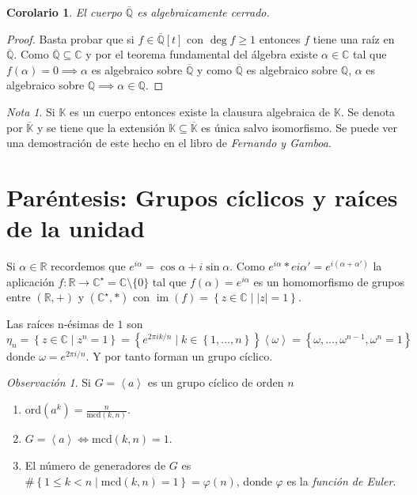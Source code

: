 \documentclass[10pt, spanish]{report}
\newtheorem{cor}{Corolario}[tma]
\theoremstyle{definition}
\theoremstyle{custom}
\theoremstyle{remark}
\newtheorem*{obs}{Observación}
\newtheorem*{nota}{Nota}
\newcommand{\Q}{\mathbb{Q}}
\newcommand{\R}{\mathbb{R}}
\newcommand{\C}{\mathbb{C}}
\newcommand{\K}{\mathbb{K}}
\newcommand{\im}[1]{\operatorname{im}\left(#1\right)}
\newcommand{\ord}[1]{\text{ord}(#1)}
\newcommand{\mcd}[1]{\text{mcd}(#1)}
\renewcommand{\geq}{\geqslant}
\renewcommand{\leq}{\leqslant}
\begin{document}
\begin{cor}
    El cuerpo $\overline{\Q}$ es algebraicamente cerrado.
\end{cor}

\begin{proof}
    Basta probar que si $f\in\overline{\Q}[t]$ con $\deg{f}\geq1$ entonces $f$
    tiene una raíz en $\overline{\Q}$. Como $\overline{\Q}\subseteq\C$ y por el
    teorema fundamental del álgebra existe $\alpha\in\C$ tal que $f(\alpha)=0
    \implies\alpha$ es algebraico sobre $\overline{\Q}$ y como $\overline{\Q}$
    es algebraico sobre $\Q$, $\alpha$ es algebraico sobre $\Q \implies
    \alpha\in\Q$.
\end{proof}

\begin{nota}
    Si $\K$ es un cuerpo entonces existe la clausura algebraica de $\K$. Se
    denota por $\overline{\K}$ y se tiene que la extensión $\K\subseteq
    \overline{\K}$ es única salvo isomorfismo. Se puede ver una demostración de
    este hecho en el libro de \textit{Fernando y Gamboa}.
\end{nota}

\section{Paréntesis: Grupos cíclicos y raíces de la unidad}

Si $\alpha\in\R$ recordemos que $e^{i\alpha}=\cos{\alpha}+i\sin{\alpha}$. Como
$e^{i\alpha}*e{i\alpha'}=e^{i(\alpha+\alpha')}$ la aplicación
$f:\R\to\C^\star=\C\setminus\{0\}$ tal que $f(\alpha)=e^{i\alpha}$ es un
homomorfismo de grupos entre $(\R,+)$ y $(\C^\star,*)$ con $\im{f}=\left\{ z\in
\C\mid \left| z \right| = 1 \right\}$.

Las raíces n-ésimas de $1$ son \[\eta_n=\left\{ z\in \C\mid z^n=1 \right\} =
\left\{ e^{2\pi ik/n}\mid k\in\left\{1,\ldots,n\right\}\right\}\left< \omega
\right> = \left\{ \omega,\ldots,\omega^{n-1},\omega^n=1 \right\}\]
donde $\omega = e^{2\pi i /n}$. Y por tanto forman un grupo cíclico.

\begin{obs}
    Si $G= \left< a \right>$ es un grupo cíclico de orden $n$
    \begin{enumerate}
        \item $\ord{a^k}=\frac{n}{\mcd{k,n}}$.
        \item $G= \left< a \right> \Leftrightarrow \mcd{k,n}=1$.
        \item El número de generadores de $G$ es $\#\left\{ 1\leq k<
            n\mid\mcd{k,n}=1 \right\}=\varphi(n)$, donde $\varphi$ es la
            \textit{función de Euler}.
    \end{enumerate}
\end{obs}
\end{document}
